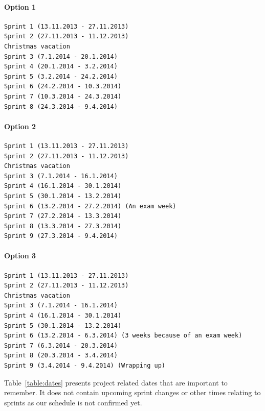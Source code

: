 \paragraph{Option 1}

\begin{verbatim}
Sprint 1 (13.11.2013 - 27.11.2013)
Sprint 2 (27.11.2013 - 11.12.2013)
Christmas vacation
Sprint 3 (7.1.2014 - 20.1.2014)
Sprint 4 (20.1.2014 - 3.2.2014)
Sprint 5 (3.2.2014 - 24.2.2014)
Sprint 6 (24.2.2014 - 10.3.2014)
Sprint 7 (10.3.2014 - 24.3.2014)
Sprint 8 (24.3.2014 - 9.4.2014) 
\end{verbatim}

\paragraph{Option 2}

\begin{verbatim}
Sprint 1 (13.11.2013 - 27.11.2013)
Sprint 2 (27.11.2013 - 11.12.2013)
Christmas vacation
Sprint 3 (7.1.2014 - 16.1.2014)
Sprint 4 (16.1.2014 - 30.1.2014)
Sprint 5 (30.1.2014 - 13.2.2014)
Sprint 6 (13.2.2014 - 27.2.2014) (An exam week)
Sprint 7 (27.2.2014 - 13.3.2014)
Sprint 8 (13.3.2014 - 27.3.2014)
Sprint 9 (27.3.2014 - 9.4.2014)
\end{verbatim}

\paragraph{Option 3}

\begin{verbatim}
Sprint 1 (13.11.2013 - 27.11.2013)
Sprint 2 (27.11.2013 - 11.12.2013)
Christmas vacation
Sprint 3 (7.1.2014 - 16.1.2014)
Sprint 4 (16.1.2014 - 30.1.2014)
Sprint 5 (30.1.2014 - 13.2.2014)
Sprint 6 (13.2.2014 - 6.3.2014) (3 weeks because of an exam week)
Sprint 7 (6.3.2014 - 20.3.2014)
Sprint 8 (20.3.2014 - 3.4.2014)
Sprint 9 (3.4.2014 - 9.4.2014) (Wrapping up) 
\end{verbatim}

Table~\ref{table:dates} presents project related dates that are important to
remember. It does not contain upcoming sprint changes or other times relating to
sprints as our schedule is not confirmed yet.

